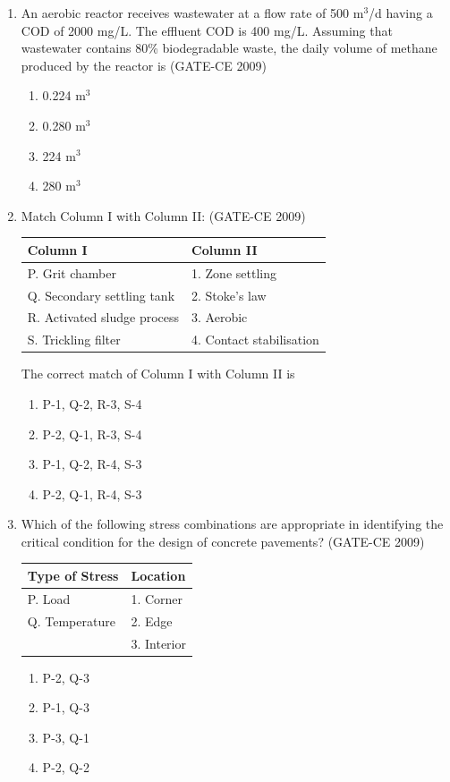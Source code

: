 \documentclass[12pt]{article}
\begin{document}
\begin{enumerate}[label=Q.\arabic*]
    \item An aerobic reactor receives wastewater at a flow rate of 500 m$^3$/d having a COD of 2000 mg/L. The effluent COD is 400 mg/L. Assuming that wastewater contains 80\% biodegradable waste, the daily volume of methane produced by the reactor is (GATE-CE 2009)
    \begin{enumerate}[label=(\Alph*)]
        \item 0.224 m$^3$ 
        \item 0.280 m$^3$ 
        \item 224 m$^3$ 
        \item 280 m$^3$
    \end{enumerate}
    
    \item Match Column I with Column II: (GATE-CE 2009)
    \begin{center}
    \begin{tabular}{|l|l|}
    \hline
    \textbf{Column I} & \textbf{Column II} \\
    \hline
    P. Grit chamber & 1. Zone settling \\
    Q. Secondary settling tank & 2. Stoke's law \\
    R. Activated sludge process & 3. Aerobic \\
    S. Trickling filter & 4. Contact stabilisation \\
    \hline
    \end{tabular}
    \end{center}
    The correct match of Column I with Column II is
    \begin{enumerate}[label=(\Alph*)]
        \item P-1, Q-2, R-3, S-4 
        \item P-2, Q-1, R-3, S-4 
        \item P-1, Q-2, R-4, S-3 
        \item P-2, Q-1, R-4, S-3
    \end{enumerate}
    
    \item Which of the following stress combinations are appropriate in identifying the critical condition for the design of concrete pavements? (GATE-CE 2009)
    \begin{center}
    \begin{tabular}{|l|l|}
    \hline
    \textbf{Type of Stress} & \textbf{Location} \\
    \hline
    P. Load & 1. Corner \\
    Q. Temperature & 2. Edge \\
    & 3. Interior \\
    \hline
    \end{tabular}
    \end{center}
    \begin{enumerate}[label=(\Alph*)]
        \item P-2, Q-3 
        \item P-1, Q-3 
        \item P-3, Q-1 
        \item P-2, Q-2
    \end{enumerate}
    

\end{enumerate}
\end{document}
